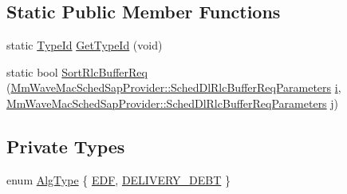 \subsection*{Static Public Member Functions}
\begin{DoxyCompactItemize}
\item 
static \hyperlink{classns3_1_1TypeId}{Type\+Id} \hyperlink{classns3_1_1MmWaveFlexTtiMaxWeightMacScheduler_aecf39cdb437503d7c0ba4fa39733d0d5}{Get\+Type\+Id} (void)
\item 
static bool \hyperlink{classns3_1_1MmWaveFlexTtiMaxWeightMacScheduler_a71ff11c554dbcf1e43684fb066eeb443}{Sort\+Rlc\+Buffer\+Req} (\hyperlink{structns3_1_1MmWaveMacSchedSapProvider_1_1SchedDlRlcBufferReqParameters}{Mm\+Wave\+Mac\+Sched\+Sap\+Provider\+::\+Sched\+Dl\+Rlc\+Buffer\+Req\+Parameters} \hyperlink{lte__uplink__power__control_8m_a6f6ccfcf58b31cb6412107d9d5281426}{i}, \hyperlink{structns3_1_1MmWaveMacSchedSapProvider_1_1SchedDlRlcBufferReqParameters}{Mm\+Wave\+Mac\+Sched\+Sap\+Provider\+::\+Sched\+Dl\+Rlc\+Buffer\+Req\+Parameters} j)
\end{DoxyCompactItemize}
\subsection*{Private Types}
\begin{DoxyCompactItemize}
\item 
enum \hyperlink{classns3_1_1MmWaveFlexTtiMaxWeightMacScheduler_a1c15c536cd0b5b7c19533c208c7817a0}{Alg\+Type} \{ \hyperlink{classns3_1_1MmWaveFlexTtiMaxWeightMacScheduler_a1c15c536cd0b5b7c19533c208c7817a0ab4a151aa9f7d0ff09d04a82f2d403df7}{E\+DF}, 
\hyperlink{classns3_1_1MmWaveFlexTtiMaxWeightMacScheduler_a1c15c536cd0b5b7c19533c208c7817a0a993d6df6a90117138929d75c2648cd2a}{D\+E\+L\+I\+V\+E\+R\+Y\+\_\+\+D\+E\+BT}
 \}
\end{DoxyCompactItemize}

